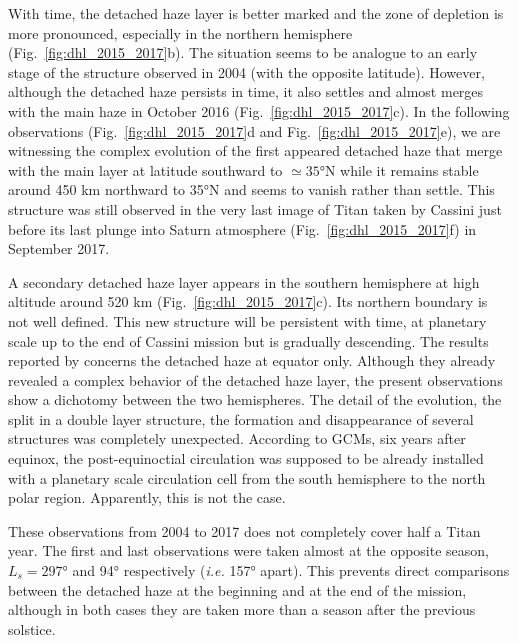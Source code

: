With time, the detached haze layer is better marked and the zone of depletion is more pronounced, especially in the
northern hemisphere (Fig.~\ref{fig:dhl_2015_2017}b). The situation seems to be analogue to an early stage of
the structure observed in 2004 (with the opposite latitude). However, although the detached haze persists in time,
it also settles and almost merges with the main haze in October 2016 (Fig.~\ref{fig:dhl_2015_2017}c).
In the  following observations (Fig.~\ref{fig:dhl_2015_2017}d and Fig.~\ref{fig:dhl_2015_2017}e), we are
witnessing the complex evolution of the first appeared detached haze that merge with the main layer at latitude southward
to $\simeq \ang{35}$N while it remains stable around 450 km northward to \ang{35}N and seems to vanish rather than settle.
This structure was still observed in the very last image of Titan taken by Cassini just before its last plunge into Saturn
atmosphere (Fig.~\ref{fig:dhl_2015_2017}f) in September 2017.

A secondary detached haze layer appears in the southern hemisphere at high altitude around 520 km
(Fig.~\ref{fig:dhl_2015_2017}c). Its northern boundary is not well defined. This new structure will be persistent with
time, at planetary scale up to the end of Cassini mission but is gradually descending. The results reported by \cite{West2018}
concerns the detached haze at equator only. Although they already revealed a complex behavior of the detached haze layer, the
present observations show a dichotomy between the two hemispheres. The detail of the evolution, the split in a double layer
structure, the formation and disappearance of several structures was completely unexpected. According to GCMs, six years
after equinox, the post-equinoctial circulation was supposed to be already installed with a planetary scale circulation cell
from the south hemisphere to the north polar region. Apparently, this is not the case.

These observations from 2004 to 2017 does not completely cover half a Titan year. The first and last observations
were taken almost at the opposite season, $L_s=\ang{297}$ and \ang{94} respectively (\emph{i.e.} \ang{157} apart).
This prevents direct comparisons between the detached haze at the beginning and at the end of the mission,
although in both cases they are taken more than a season after the previous solstice.
